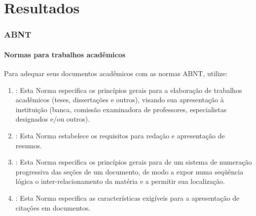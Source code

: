 \section{Resultados}

\begin{frame}
\frametitle{ABNT}
\framesubtitle{Normas para trabalhos acadêmicos}

Para adequar seus documentos acadêmicos com as normas ABNT, utilize:
\begin{enumerate}
 \item {}: Esta Norma especifica os princípios gerais
 para a elaboração de trabalhos acadêmicos (teses, dissertações e outros),
 visando sua apresentação à instituição (banca, comissão examinadora de
 professores, especialistas designados e/ou outros).
 
 \item {}: Esta Norma estabelece os requisitos para
 redação e apresentação de resumos.
 
 \item {}: Esta Norma especifica os princípios gerais
 para de um sistema de numeração progressiva das seções de um documento, de
 modo a expor numa seqüência lógica o inter-relacionamento da matéria e a
 permitir sua localização.
 
 \item {}: Esta Norma especifica as características
 exigíveis para a apresentação de citações em documentos.
\end{enumerate}

\end{frame}